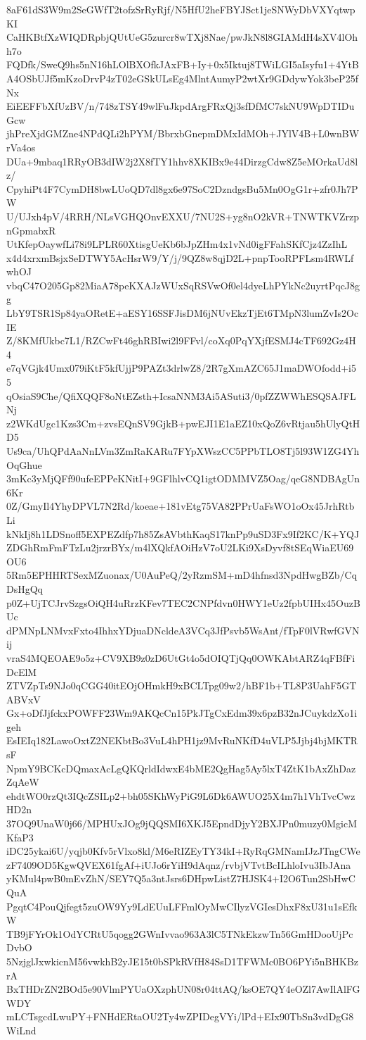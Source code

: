 8aF61dS3W9m2SeGWfT2tofzSrRyRjf/N5HfU2heFBYJSct1jeSNWyDbVXYqtwpKI
CaHKBtfXzWIQDRpbjQUtUeG5zurcr8wTXj8Nae/pwJkN8l8GIAMdH4sXV4lOhh7o
FQDfk/SweQ9hs5nN16hLOlBXOfkJAxFB+Iy+0x5Iktuj8TWiLGI5aIsyfu1+4YtB
A4OSbUJf5mKzoDrvP4zT02eGSkULsEg4MlntAumyP2wtXr9GDdywYok3beP25fNx
EiEEFFbXfUzBV/n/748zTSY49wlFuJkpdArgFRxQj3sfDfMC7skNU9WpDTIDuGcw
jhPreXjdGMZne4NPdQLi2hPYM/BbrxbGnepmDMxIdMOh+JYlV4B+L0wnBWrVa4os
DUa+9mbaq1RRyOB3dIW2j2X8fTY1hhv8XKIBx9e44DirzgCdw8Z5eMOrkaUd8lz/
CpyhiPt4F7CymDH8bwLUoQD7dl8gx6e97SoC2DzndgsBu5Mn0OgG1r+zfr0Jh7PW
U/UJxh4pV/4RRH/NLsVGHQOnvEXXU/7NU2S+yg8nO2kVR+TNWTKVZrzpnGpmabxR
UtKfepOaywfLi78i9LPLR60XtisgUeKb6bJpZHm4x1vNd0igFFahSKfCjz4ZzIhL
x4d4xrxmBsjxSeDTWY5AcHsrW9/Y/j/9QZ8w8qjD2L+pnpTooRPFLsm4RWLfwhOJ
vbqC47O205Gp82MiaA78peKXAJzWUxSqRSVwOf0el4dyeLhPYkNc2uyrtPqcJ8gg
LbY9TSR1Sp84yaORetE+aESY16SSFJisDM6jNUvEkzTjEt6TMpN3lumZvIs2OcIE
Z/8KMfUkbc7L1/RZCwFt46ghRBIwi2l9FFvl/coXq0PqYXjfESMJ4cTF692Gz4H4
e7qVGjk4Umx079iKtF5kfUjjP9PAZt3drlwZ8/2R7gXmAZC65J1maDWOfodd+i55
qOsiaS9Che/QfiXQQF8oNtEZsth+IcsaNNM3Ai5ASuti3/0pfZZWWhESQSAJFLNj
z2WKdUgc1Kzs3Cm+zvsEQnSV9GjkB+pwEJI1E1aEZ10xQoZ6vRtjau5hUlyQtHD5
Us9ca/UhQPdAaNnLVm3ZmRaKARu7FYpXWszCC5PPbTLO8Tj5l93W1ZG4YhOqGhue
3mKc3yMjQFf90ufeEPPeKNitI+9GFlhlvCQ1igtODMMVZ5Oag/qeG8NDBAgUn6Kr
0Z/GmyIl4YhyDPVL7N2Rd/koeae+181vEtg75VA82PPrUaFsWO1oOx45JrhRtbLi
kNkIj8h1LDSnoff5EXPEZdfp7h85ZsAVbthKaqS17knPp9uSD3Fx9If2KC/K+YQJ
ZDGhRmFmFTzLu2jrzrBYx/m4lXQkfAOiHzV7oU2LKi9XsDyvf8tSEqWiaEU69OU6
5Rm5EPHHRTSexMZuonax/U0AuPeQ/2yRzmSM+mD4hfnsd3NpdHwgBZb/CqDsHgQq
p0Z+UjTCJrvSzgsOiQH4uRrzKFev7TEC2CNPfdvn0HWY1eUz2fpbUIHx45OuzBUc
dPMNpLNMvxFxto4IhhxYDjuaDNcldeA3VCq3JfPsvb5WsAnt/fTpF0lVRwfGVNij
vraS4MQEOAE9o5z+CV9XB9z0zD6UtGt4o5dOIQTjQq0OWKAbtARZ4qFBfFiDcElM
ZTVZpTs9NJo0qCGG40itEOjOHmkH9xBCLTpg09w2/hBF1b+TL8P3UahF5GTABVxV
Gx+oDfJjfckxPOWFF23Wm9AKQcCn15PkJTgCxEdm39x6pzB32nJCuykdzXo1igeh
EsIEIq182LawoOxtZ2NEKbtBo3VuL4hPH1jz9MvRuNKfD4uVLP5Jjbj4bjMKTRsF
NpmY9BCKcDQmaxAcLgQKQrldIdwxE4bME2QgHag5Ay5lxT4ZtK1bAxZhDazZqAeW
ehdtWO0rzQt3IQcZSILp2+bh05SKhWyPiG9L6Dk6AWUO25X4m7h1VhTvcCwzHD2n
37OQ9UnaW0j66/MPHUxJOg9jQQSMI6XKJ5EpndDjyY2BXJPn0muzy0MgicMKfaP3
iDC25ykai6U/yqjb0Kfv5rVlxo8kl/M6eRIZEyTY34kI+RyRqGMNamIJzJTngCWe
zF7409OD5KgwQVEX61fgAf+iUJo6rYiH9dAqnz/rvbjVTvtBcILhloIvu3IbJAna
yKMul4pwB0mEvZhN/SEY7Q5a3ntJsrs6DHpwListZ7HJSK4+I2O6Tun2SbHwCQuA
PgqtC4PouQjfegt5zuOW9Yy9LdEUuLFFmlOyMwCIlyzVGIesDhxF8xU31u1sEfkW
TB9jFYrOk1OdYCRtU5qogg2GWnIvvao963A3lC5TNkEkzwTn56GmHDooUjPcDvbO
5NzjglJxwkicnM56vwkhB2yJE15t0bSPkRVfH84SsD1TFWMc0BO6PYi5nBHKBzrA
BxTHDrZN2BOd5e90VlmPYUaOXzphUN08r04ttAQ/ksOE7QY4eOZl7AwIlAlFGWDY
mLCTsgcdLwuPY+FNHdERtaOU2Ty4wZPIDegVYi/lPd+EIx90TbSn3vdDgG8WiLnd

